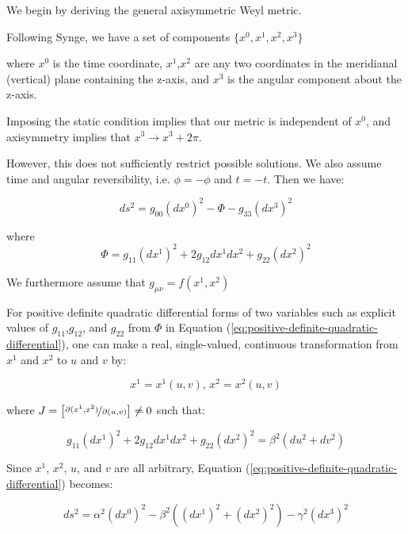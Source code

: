 \documentclass{article}
\begin{document}
We begin by deriving the general axisymmetric Weyl metric.

Following Synge\cite{synge_relativity}, we have a set of components $\{x^0,x^1,x^2,x^3\}$ 

where $x^{0}$ is the time coordinate, $x^{1}$,$x^{2}$ are any two coordinates in the meridianal (vertical)
plane containing the z-axis, and $x^{3}$ is the angular component about the z-axis. 

Imposing the static condition implies that our metric is independent of $x^{0}$, and axisymmetry implies that $x^{3}\rightarrow x^{3}+2\pi$.

However, this does not sufficiently restrict possible solutions. We also assume time and angular reversibility, i.e. $\phi = -\phi$ and $t = -t$. Then we have:

\begin{equation}
ds^{2}=g_{00}\left(dx^{0}\right)^{2}-\Phi -g_{33}\left(dx^{3}\right)^{2}\label{eq:positive-definite-quadratic-differential}
\end{equation}

where
\begin{equation}
\Phi=g_{11}\left(dx^{1}\right)^{2}+2g_{12}dx^{1}dx^{2}+g_{22}\left(dx^{2}\right)^{2}
\end{equation}

We furthermore assume that $g_{\mu\nu}=f\left(x^{1},x^{2}\right)$

For positive definite quadratic differential forms of two variables
such as explicit values of $g_{11}$,$g_{12}$, and $g_{22}$ from
$\Phi$ in Equation (\ref{eq:positive-definite-quadratic-differential}),
one can make a real, single-valued, continuous transformation from
$x^{1}$ and $x^{2}$ to $u$ and $v$ by:

\begin{equation}
x^{1}=x^{1}(u,v),\, x^{2}=x^{2}(u,v)
\end{equation}

where $J=\left[\nicefrac{\partial(x^{1},x^{2})}{\partial(u,v)}\right]\neq0$
such that:

\begin{equation}
g_{11}\left(dx^{1}\right)^{2}+2g_{12}dx^{1}dx^{2}+g_{22}\left(dx^{2}\right)^{2}=\beta^{2}\left(du^{2}+dv^{2}\right)
\end{equation}

Since $x^{1}$, $x^2$, $u$, and $v$ are all arbitrary, Equation (\ref{eq:positive-definite-quadratic-differential}) becomes:

\begin{equation}
ds^{2}=\alpha^{2} \left(dx^{0}\right)^{2}-\beta^{2}\left(\left(dx^{1}\right)^{2}+\left(dx^{2}\right)^{2}\right)-\gamma^{2}\left(dx^{3}\right)^{2}\label{eq:generic-axisymmetric-static-metric}
\end{equation}
\end{document}
